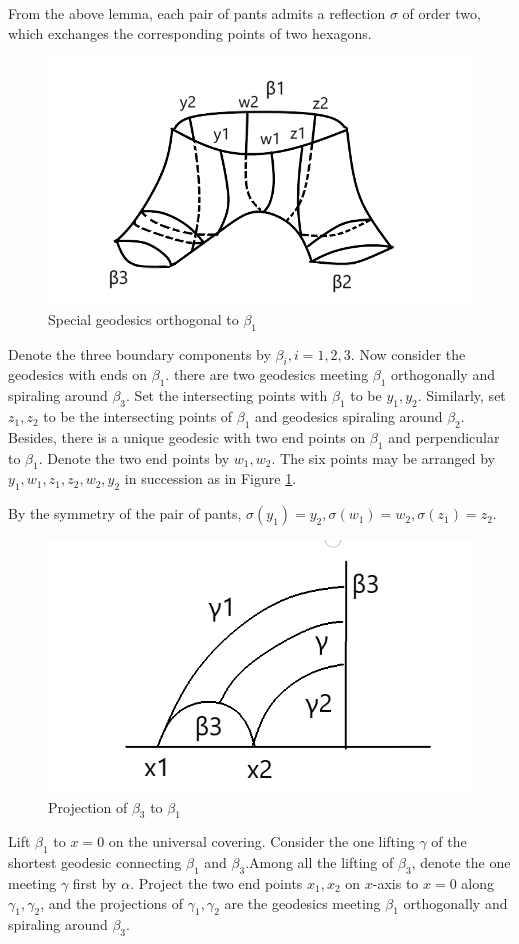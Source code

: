  
 From the above lemma, each pair of pants admits a reflection $\sigma$ of order two, which exchanges the corresponding points of two hexagons.  
 
\begin{figure}[h]
    \centering
    \includegraphics[width=3 in]{picture/pantshy.png}
    \caption{Special geodesics orthogonal to $\beta_1$}
    \label{fig:pantshy}
\end{figure}
 
 Denote the three boundary components by $\beta_i,i=1,2,3$. Now consider the geodesics with ends on $\beta_1$. there are two geodesics  meeting $\beta_1$ orthogonally and spiraling around  $\beta_3$. Set the intersecting points with $\beta_1$ to be $y_1,y_2$. Similarly, set $z_1,z_2$ to be the intersecting points of $\beta_1$ and geodesics spiraling around $\beta_2$. Besides, there is a unique geodesic with two end points on $\beta_1$ and perpendicular to $\beta_1$. Denote the two end points by $w_1,w_2$. The six points may be arranged by $y_1,w_1,z_1,z_2,w_2,y_2$ in succession as in Figure \ref{fig:pantshy}.
 
 By the symmetry of the pair of pants, $\sigma(y_1)=y_2,\sigma(w_1)=w_2,\sigma(z_1)=z_2$.
 

 \begin{figure}[h]
     \centering
     \includegraphics[width=3 in ]{picture/touying.png}
     \caption{Projection of $\beta_3$ to $\beta_1$}
     \label{fig:touying}
 \end{figure}
 
 
 \begin{remark}
 Lift $\beta_1$ to $x=0$ on the universal covering. Consider the one lifting $\gamma$ of the shortest geodesic connecting $\beta_1$ and $\beta_3$.Among all the lifting of $\beta_3$, denote the one meeting $\gamma$ first by $\alpha$. Project the two end points $x_1,x_2$ on $x$-axis to $x=0$ along $\gamma_1,\gamma_2$, and the projections of $\gamma_1,\gamma_2$ are the geodesics meeting $\beta_1$ orthogonally and spiraling around $\beta_3$.
 \end{remark}
 
